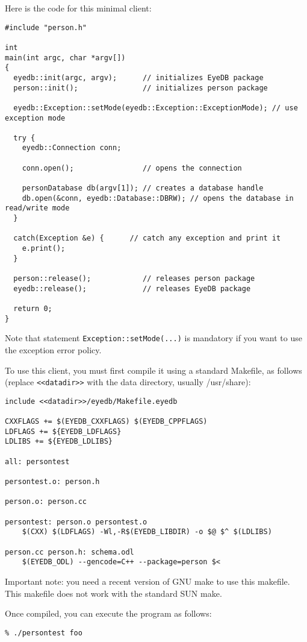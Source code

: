 Here is the code for this minimal client:
\verbsize \begin{verbatim}
#include "person.h"

int
main(int argc, char *argv[])
{
  eyedb::init(argc, argv);      // initializes EyeDB package
  person::init();               // initializes person package

  eyedb::Exception::setMode(eyedb::Exception::ExceptionMode); // use exception mode

  try {
    eyedb::Connection conn;

    conn.open();                // opens the connection

    personDatabase db(argv[1]); // creates a database handle
    db.open(&conn, eyedb::Database::DBRW); // opens the database in read/write mode
  }

  catch(Exception &e) {      // catch any exception and print it
    e.print();
  }

  person::release();            // releases person package
  eyedb::release();             // releases EyeDB package

  return 0;
}
\end{verbatim}
\normalsize

Note that statement \texttt{Exception::setMode(...)} is mandatory
if you want to use the exception error policy.

To use this client, you must first compile it using a standard Makefile, as follows 
(replace \texttt{<<datadir>>} with the data directory, usually /usr/share):
\verbsize \begin{verbatim}
include <<datadir>>/eyedb/Makefile.eyedb

CXXFLAGS += $(EYEDB_CXXFLAGS) $(EYEDB_CPPFLAGS)
LDFLAGS += ${EYEDB_LDFLAGS}
LDLIBS += ${EYEDB_LDLIBS}

all: persontest

persontest.o: person.h

person.o: person.cc

persontest: person.o persontest.o
	$(CXX) $(LDFLAGS) -Wl,-R$(EYEDB_LIBDIR) -o $@ $^ $(LDLIBS)

person.cc person.h: schema.odl
	$(EYEDB_ODL) --gencode=C++ --package=person $<
\end{verbatim}
\normalsize

Important note: you need a recent version of GNU make to use this makefile.
This makefile does not work with the standard SUN make.

Once compiled, you can execute the program as follows:
\verbsize \begin{verbatim}
% ./persontest foo
\end{verbatim}
\normalsize

